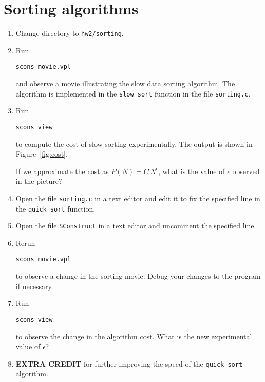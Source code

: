\section{Sorting algorithms}

\begin{enumerate}          
\item Change directory to \texttt{hw2/sorting}.
\item Run
\begin{verbatim}
scons movie.vpl
\end{verbatim}
and observe a movie illustrating the slow data sorting algorithm. The
algorithm is implemented in the \texttt{slow\_sort} function in the
file \texttt{sorting.c}.

\item Run
\begin{verbatim}
scons view
\end{verbatim}
to compute the cost of slow sorting experimentally. The output is
shown in Figure~\ref{fig:cost}.


If we approximate the cost as $P(N)=C\,N^\epsilon$, what is the value of
$\epsilon$ observed in the picture?

\item Open the file \texttt{sorting.c} in a text editor and edit it to 
fix the specified line in the \texttt{quick\_sort} function.

\item Open the file \texttt{SConstruct} in a text editor and uncomment 
      the specified line.

\item Rerun
\begin{verbatim}
scons movie.vpl
\end{verbatim}
to observe a change in the sorting movie. Debug your changes to the
program if necessary.

\item Run
\begin{verbatim}
scons view
\end{verbatim}
to observe the change in the algorithm cost. What is the new
experimental value of $\epsilon$?

\item \textbf{EXTRA CREDIT} for
further improving the speed of the 
\texttt{quick\_sort} algorithm.
\end{enumerate}

